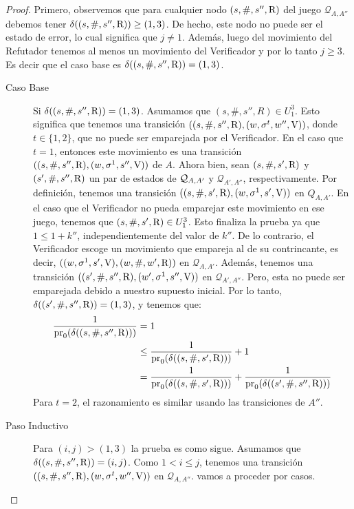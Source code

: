 \begin{proof}
Primero, observemos que para cualquier nodo $(s, \#, s'', \mathrm{R})$ del juego $\mathcal{Q}_{A,A''}$ debemos tener $\delta((s, \#, s'', \mathrm{R})) \geq (1,3)$.
De hecho, este nodo no puede ser el estado de error, lo cual significa que $j \neq 1$. Además, luego del movimiento del Refutador tenemos al menos un movimiento del Verificador y por lo tanto $j \geq 3$. Es decir que el caso base es $\delta((s,\#, s'', \mathrm{R})) = (1,3)$.
\begin{description}
\item [Caso Base] Si $\delta((s,\#, s'', \mathrm{R})) = (1,3)$. Asumamos que $(s, \#, s'', R) \in U^3_1$. Esto significa que tenemos una transición 
$((s, \#, s'', \mathrm{R}), (w, \sigma^t, w'', \mathrm{V}))$, donde $t \in \{1,2\}$, que no puede ser emparejada por el Verificador. 
En el caso que $t=1$, entonces este movimiento es una transición $((s, \#, s'', \mathrm{R}), (w, \sigma^1, s'', \mathrm{V}))$ de $A$. 
Ahora bien, sean $(s, \#, s', \mathrm{R})$ y $(s', \#, s'', \mathrm{R})$ un par de estados de $\mathcal{Q}_{A, A'}$ y $\mathcal{Q}_{A',A''}$, respectivamente. 
Por definición, tenemos una transición $((s, \#, s', \mathrm{R}), (w, \sigma^1, s', \mathrm{V}))$ en $Q_{A,A'}$. 
En el caso que el Verificador no pueda emparejar este movimiento en ese juego, tenemos que $(s, \#, s', \mathrm{R}) \in U^3_1$. 
Esto finaliza la prueba ya que $1 \leq 1 + k''$, independientemente del valor de $k''$. 
De lo contrario, el Verificador escoge un movimiento que empareja al de su contrincante, es decir, $((w, \sigma^1, s', \mathrm{V}), (w, \#, w', \mathrm{R}))$ en $\mathcal{Q}_{A,A'}$. 
Además, tenemos una transición $((s', \#, s'', \mathrm{R}), (w', \sigma^1, s'', \mathrm{V}))$ en $\mathcal{Q}_{A',A''}$. 
Pero, esta no puede ser emparejada debido a nuestro supuesto inicial. Por lo tanto, $\delta((s', \#, s'', \mathrm{R}))= (1,3)$, y tenemos que:
\begin{align*}
	\frac{1}{\operatorname{pr}_{0}(\delta((s,\#, s'', \mathrm{R})))}  & = 1\\
							& \leq \frac{1}{\operatorname{pr}_{0}(\delta((s, \#, s', \mathrm{R})))} + 1\\
							& =   \frac{1}{\operatorname{pr}_{0}(\delta((s, \#, s', \mathrm{R})))}  + \frac{1}{\operatorname{pr}_{0}(\delta((s', \#, s'', \mathrm{R})))}
\end{align*}
Para $t=2$,  el razonamiento es similar usando las transiciones de $A''$. 

\item [Paso Inductivo] Para $(i,j) > (1,3)$ la prueba es como sigue. 
Asumamos que $\delta((s, \#, s'', \mathrm{R})) = (i,j)$. Como $1<i \leq j$, tenemos una transición 
$((s, \#, s'', \mathrm{R}), (w, \sigma^t, w'', \mathrm{V}))$ en $\mathcal{Q}_{A,A''}$. vamos a proceder por casos.


\end{description}
\end{proof}
